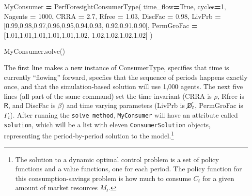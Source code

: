 \documentclass[10pt,twocolumn]{article}
\newenvironment{Shaded}{\begin{snugshade}}{\end{snugshade}}
\newcommand{\DecValTok}[1]{\textcolor[rgb]{0.00,0.00,0.81}{#1}}
\newcommand{\FloatTok}[1]{\textcolor[rgb]{0.00,0.00,0.81}{#1}}
\newcommand{\VariableTok}[1]{\textcolor[rgb]{0.00,0.00,0.00}{#1}}
\newcommand{\OperatorTok}[1]{\textcolor[rgb]{0.81,0.36,0.00}{\textbf{#1}}}
\newcommand{\NormalTok}[1]{#1}
\let\rmarkdownfootnote\footnote%
\def\footnote{\protect\rmarkdownfootnote}
\begin{document}
\begin{Shaded}
\begin{Highlighting}[]
\NormalTok{MyConsumer }\OperatorTok{=}\NormalTok{ PerfForesightConsumerType(}
\NormalTok{    time_flow}\OperatorTok{=}\VariableTok{True}\NormalTok{, cycles}\OperatorTok{=}\DecValTok{1}\NormalTok{, Nagents }\OperatorTok{=} \DecValTok{1000}\NormalTok{,}
\NormalTok{    CRRA }\OperatorTok{=} \FloatTok{2.7}\NormalTok{, Rfree }\OperatorTok{=} \FloatTok{1.03}\NormalTok{, DiscFac }\OperatorTok{=} \FloatTok{0.98}\NormalTok{,}
\NormalTok{    LivPrb }\OperatorTok{=}\NormalTok{ [}\FloatTok{0.99}\NormalTok{,}\FloatTok{0.98}\NormalTok{,}\FloatTok{0.97}\NormalTok{,}\FloatTok{0.96}\NormalTok{,}\FloatTok{0.95}\NormalTok{,}\FloatTok{0.94}\NormalTok{,}\FloatTok{0.93}\NormalTok{,}
              \FloatTok{0.92}\NormalTok{,}\FloatTok{0.91}\NormalTok{,}\FloatTok{0.90}\NormalTok{],}
\NormalTok{    PermGroFac }\OperatorTok{=}\NormalTok{ [}\FloatTok{1.01}\NormalTok{,}\FloatTok{1.01}\NormalTok{,}\FloatTok{1.01}\NormalTok{,}\FloatTok{1.01}\NormalTok{,}\FloatTok{1.01}\NormalTok{,}\FloatTok{1.02}\NormalTok{,}
                  \FloatTok{1.02}\NormalTok{,}\FloatTok{1.02}\NormalTok{,}\FloatTok{1.02}\NormalTok{,}\FloatTok{1.02}\NormalTok{] )}

\NormalTok{MyConsumer.solve()}
\end{Highlighting}
\end{Shaded}

The first line makes a new instance of ConsumerType, specifies that time
is currently ``flowing'' forward, specfies that the sequence of periods
happens exactly once, and that the simulation-based solution will use
1,000 agents. The next five lines (all part of the same command) set the
time invariant (CRRA is \(\rho\), Rfree is \(\mathsf{R}\), and DiscFac
is \(\beta\)) and time varying parameters (LivPrb is
\(\cancel{\mathsf{D}}_t\), PermGroFac is \(\Gamma_{t}\)). After running
the \texttt{solve\ method}, \texttt{MyConsumer} will have an attribute
called \texttt{solution}, which will be a list with eleven
\texttt{ConsumerSolution} objects, representing the period-by-period
solution to the model.\footnote{The solution to a dynamic optimal
  control problem is a set of policy functions and a value functions,
  one for each period. The policy function for this consumption-savings
  problem is how much to consume \(C_t\) for a given amount of market
  resources \(M_t\).}
\end{document}
